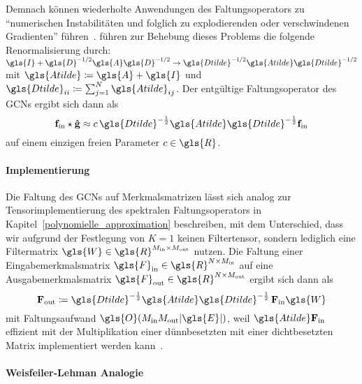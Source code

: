 Demnach können wiederholte Anwendungen des Faltungsoperators zu \enquote{numerischen Instabilitäten und folglich zu explodierenden oder verschwindenen Gradienten} führen~\cite{gcn}.
\citeauthor{gcn} führen zur Behebung dieses Problems die folgende Renormalisierung durch: $\gls{I} + \gls{D}^{-1/2} \gls{A} \gls{D}^{-1/2} \rightarrow \gls{Dtilde}^{-1/2} \gls{Atilde} \gls{Dtilde}^{-1/2}$ mit $\gls{Atilde} \coloneqq \gls{A} + \gls{I}$ und $\gls{Dtilde}_{ii} \coloneqq \sum_{j=1}^N \gls{Atilde}_{ij}$.
Der entgültige Faltungsoperator des \glspl{GCN} ergibt sich dann als
\begin{equation}
  \ve{f}_{\mathrm{in}} \star \ve{\hat g} \approx c\, \gls{Dtilde}^{-\frac{1}{2}} \gls{Atilde} \gls{Dtilde}^{-\frac{1}{2}} \ve{f}_{\mathrm{in}}
  \label{eq:gcn_renorm}
\end{equation}
auf einem einzigen freien Parameter $c \in \gls{R}$.

\paragraph{Implementierung}
\label{gcn_tensor}

Die Faltung des \glspl{GCN} auf Merkmalsmatrizen lässt sich analog zur Tensorimplementierung des spektralen Faltungsoperators in Kapitel~\ref{polynomielle_approximation} beschreiben, mit dem Unterschied, dass wir aufgrund der Festlegung von $K=1$ keinen Filtertensor, sondern lediglich eine Filtermatrix $\gls{W} \in \gls{R}^{M_{\mathrm{in}} \times M_{\mathrm{out}}}$ nutzen.
Die Faltung einer Eingabemerkmalsmatrix $\gls{F}_{\mathrm{in}} \in \gls{R}^{N \times M_{\mathrm{in}}}$ auf eine Ausgabemerkmalsmatrix $\gls{F}_{\mathrm{out}} \in \gls{R}^{N \times M_{\mathrm{out}}}$ ergibt sich dann als
\begin{equation}
  \ma{F}_{\mathrm{out}} \coloneqq \gls{Dtilde}^{-\frac{1}{2}} \gls{Atilde} \gls{Dtilde}^{-\frac{1}{2}}\, \ma{F}_{\mathrm{in}} \gls{W}
  \label{eq:gcn_tensor}
\end{equation}
mit Faltungsaufwand $\gls{O}\left(M_{\mathrm{in}}M_{\mathrm{out}}\left|\gls{E}\right|\right)$, weil $\gls{Atilde}\ma{F}_{\mathrm{in}}$ effizient mit der Multiplikation einer dünnbesetzten mit einer dichtbesetzten Matrix implementiert werden kann~\cite{gcn}.

\paragraph{Weisfeiler-Lehman Analogie}
\label{weisfeiler_lehman_analogie}

